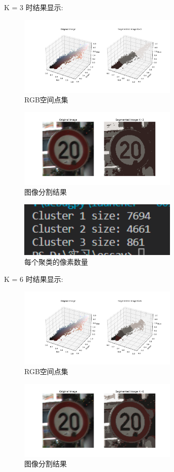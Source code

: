 \documentclass[lettersize,journal]{IEEEtran}
\begin{document}
K = 3 时结果显示:

\begin{figure}[H]
\centering
\includegraphics[width=3in]{image/scatter_3.png}
\caption{RGB空间点集}
\end{figure}

\begin{figure}[H]
\centering
\includegraphics[width=3in]{image/Image_3.png}
\caption{图像分割结果}
\end{figure}

\begin{figure}[H]
\centering
\includegraphics[width=3in]{image/K3.png}
\caption{每个聚类的像素数量}
\end{figure}

K = 6 时结果显示:

\begin{figure}[H]
\centering
\includegraphics[width=3in]{image/scatter_6.png}
\caption{RGB空间点集}
\end{figure}

\begin{figure}[H]
\centering
\includegraphics[width=3in]{image/Image_6.png}
\caption{图像分割结果}
\end{figure}
\end{document}
